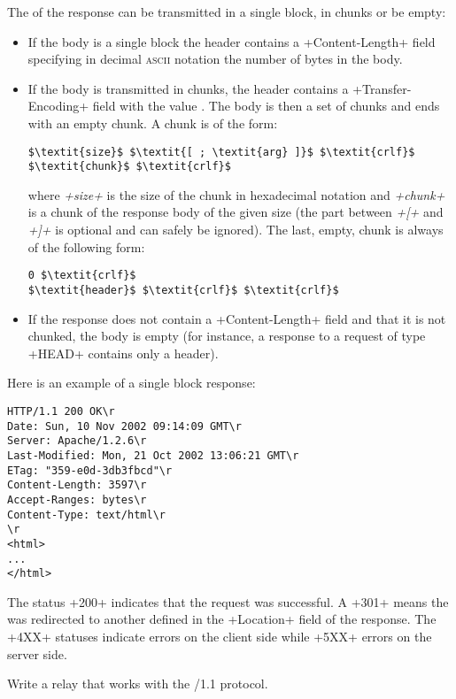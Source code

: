 The \textit{} of the response can be transmitted in a
single block, in chunks or be empty: 

\begin{itemize}
\item If the body is a single block the header
contains a \ml+Content-Length+ field specifying in decimal
\textsc{ascii} notation the number of bytes in the body. 

\item If the body is transmitted in chunks, 
  the header contains a \ml+Transfer-Encoding+
field with the value . The body is then a set of chunks
and ends with an empty chunk.  A chunk is of the form:
%
\begin{lstlisting}
$\textit{size}$ $\textit{[ ; \textit{arg} ]}$ $\textit{crlf}$
$\textit{chunk}$ $\textit{crlf}$
\end{lstlisting}
% 
where \textit{\ml+size+} is the size of the chunk in hexadecimal
notation and \textit{\ml+chunk+} is a chunk of the response body of
the given size (the part between \textit{\ml+[+} and \textit{\ml+]+}
is optional and can safely be ignored).  The last, empty, chunk is
always of the following form:
%
\begin{lstlisting}
0 $\textit{crlf}$
$\textit{header}$ $\textit{crlf}$ $\textit{crlf}$
\end{lstlisting}
%
\item If the response does not contain a \ml+Content-Length+ field and
  that it is not chunked, the body is empty (for instance, a
response to a request of type \ml+HEAD+ contains only a header). 
\end{itemize}
%
Here is an example of a single block response:
\begin{lstlisting}
HTTP/1.1 200 OK\r
Date: Sun, 10 Nov 2002 09:14:09 GMT\r
Server: Apache/1.2.6\r
Last-Modified: Mon, 21 Oct 2002 13:06:21 GMT\r
ETag: "359-e0d-3db3fbcd"\r
Content-Length: 3597\r
Accept-Ranges: bytes\r
Content-Type: text/html\r
\r
<html>
...
</html>
\end{lstlisting}
The status \ml+200+ indicates that the request was successful. A
\ml+301+ means the {\URL} was redirected to another {\URL} defined in
the \ml+Location+ field of the response. The \ml+4XX+ statuses
indicate errors on the client side while \ml+5XX+ errors on the server
side.

\begin{exercise}[noanswer]
\label{ex/proxy-1.1}
Write a relay that works with the \http/1.1 protocol.
\end{exercise}

